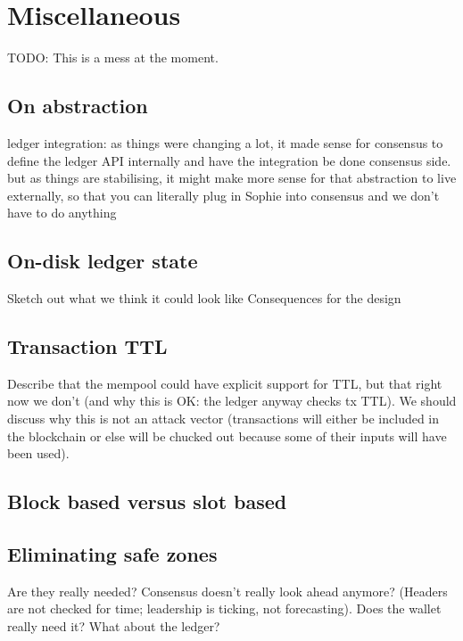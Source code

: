 \chapter{Miscellaneous}

TODO: This is a mess at the moment.

\section{On abstraction}

ledger integration: as things were changing a lot, it made sense for consensus to define the ledger API internally and have the integration be done consensus side. but as things are stabilising, it might make more sense for that abstraction to live externally, so that you can literally plug in Sophie into consensus and we don't have to do anything

\section{On-disk ledger state}

\duncan

Sketch out what we think it could look like
Consequences for the design

\section{Transaction TTL}
\label{future:ttl}

Describe that the mempool could have explicit support for TTL, but that right now we don't (and why this is OK: the ledger anyway checks tx TTL). We should discuss why this is not an attack vector (transactions will either be included in the blockchain or else will be chucked out because some of their inputs will have been used).

\section{Block based versus slot based}
\label{future:block-vs-slot}

\section{Eliminating safe zones}
\label{future:eliminating-safezones}

Are they really needed? Consensus doesn't really look ahead anymore?
(Headers are not checked for time; leadership is ticking, not forecasting).
Does the wallet really need it? What about the ledger?

